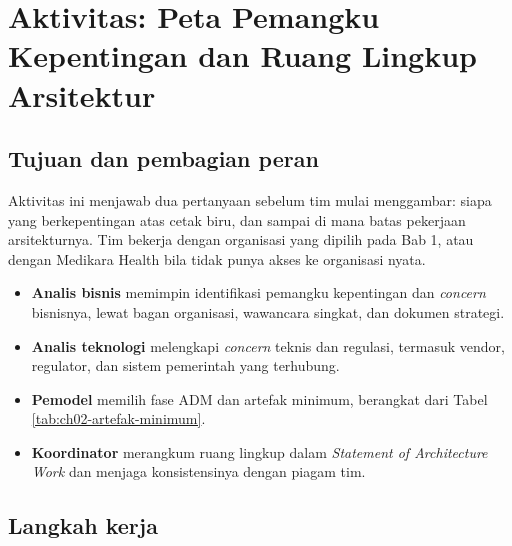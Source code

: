 \section{Aktivitas: Peta Pemangku Kepentingan dan Ruang Lingkup Arsitektur}

\subsection*{Tujuan dan pembagian peran}

Aktivitas ini menjawab dua pertanyaan sebelum tim mulai menggambar: siapa
yang berkepentingan atas cetak biru, dan sampai di mana batas pekerjaan
arsitekturnya. Tim bekerja dengan organisasi yang dipilih pada Bab 1, atau
dengan Medikara Health bila tidak punya akses ke organisasi nyata.

\begin{itemize}
  \item \textbf{Analis bisnis} memimpin identifikasi pemangku kepentingan dan
        \textit{concern} bisnisnya, lewat bagan organisasi, wawancara
        singkat, dan dokumen strategi.
  \item \textbf{Analis teknologi} melengkapi \textit{concern} teknis dan
        regulasi, termasuk vendor, regulator, dan sistem pemerintah yang
        terhubung.
  \item \textbf{Pemodel} memilih fase ADM dan artefak minimum, berangkat dari
        Tabel \ref{tab:ch02-artefak-minimum}.
  \item \textbf{Koordinator} merangkum ruang lingkup dalam \textit{Statement
        of Architecture Work} dan menjaga konsistensinya dengan piagam tim.
\end{itemize}

\subsection*{Langkah kerja}

